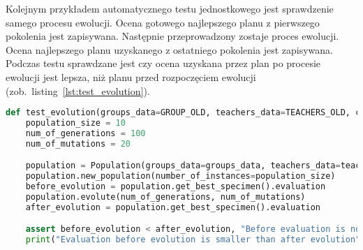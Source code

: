 	Kolejnym przykładem automatycznego testu jednostkowego jest sprawdzenie samego procesu ewolucji. Ocena gotowego najlepszego planu z pierwszego pokolenia jest zapisywana. Następnie przeprowadzony zostaje proces ewolucji. Ocena najlepszego planu uzyskanego z ostatniego pokolenia jest zapisywana. Podczas testu sprawdzane jest czy ocena uzyskana przez plan po procesie ewolucji jest lepsza, niż planu przed rozpoczęciem ewolucji (zob.~listing~\ref{lst:test_evolution}).
	
	\begin{lstlisting}[language=Python, caption=Implementacja przykładowego testu jednostkowego sprawdzającego proces ewolucji, label={lst:test_evolution}]
	def test_evolution(groups_data=GROUP_OLD, teachers_data=TEACHERS_OLD, classrooms_data=CLASSES_OLD):
    population_size = 10
    num_of_generations = 100
    num_of_mutations = 20

    population = Population(groups_data=groups_data, teachers_data=teachers_data, classrooms_data=classrooms_data)
    population.new_population(number_of_instances=population_size)
    before_evolution = population.get_best_specimen().evaluation
    population.evolute(num_of_generations, num_of_mutations)
    after_evolution = population.get_best_specimen().evaluation

    assert before_evolution < after_evolution, "Before evaluation is not smaller than after evaluation"
    print("Evaluation before evolution is smaller than after evolution")
\end{lstlisting}


